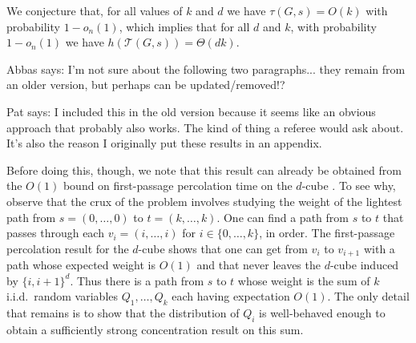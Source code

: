 \documentclass{patmorin}
\newcommand{\tcal}{\mathcal{T}}
\begin{document}
We conjecture that, for all values of $k$ and $d$ we have $\tau(G,s)=O(k)$
with probability $1-o_n(1)$, which implies that for all $d$ and $k$,
with probability $1-o_n(1)$ we have $h(\tcal(G,s))=\Theta(dk)$.


%


%
%


\begin{todo}
Abbas says: I'm not sure about the following two paragraphs... they remain from an older version, but perhaps can be updated/removed!?

\noindent
Pat says: I included this in the old version because it seems like an obvious approach that probably also works. The kind of thing a referee would ask about. It's also the reason I originally put these results in an appendix.
\end{todo}

Before doing this, though, we note that this result can already be
obtained from the $O(1)$ bound on first-passage percolation time on the
$d$-cube \cite{fill.pemantle:percolation, martinsson:unoriented}.  To see
why, observe that the crux of the problem involves studying the weight
of the lightest path from $s=(0,\ldots,0)$ to $t=(k,\ldots,k)$. One can
find a path from $s$ to $t$ that passes through each $v_i=(i,\ldots,i)$
for $i\in\{0,\ldots,k\}$, in order.  The first-passage percolation
result for the $d$-cube shows that one can get from $v_i$ to $v_{i+1}$
with a path whose expected weight is $O(1)$ and that never leaves the
$d$-cube induced by $\{i,i+1\}^d$.  Thus there is a path from $s$ to $t$
whose weight is the sum of $k$ i.i.d.\ random variables $Q_1,\ldots,Q_k$
each having expectation $O(1)$. The only detail that remains is to
show that the distribution of $Q_i$ is well-behaved enough to obtain a
sufficiently strong concentration result on this sum.
\end{document}
